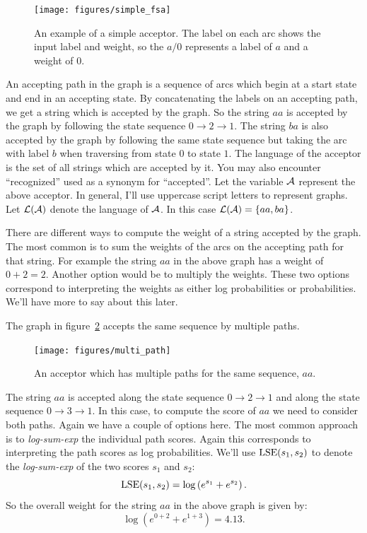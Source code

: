 \documentclass[main.tex]{subfiles}
\begin{document}
\begin{figure}
    \centering
    \texttt{[image: figures/simple\_fsa]}
    \caption{An example of a simple acceptor. The label on each arc shows the
    input label and weight, so the $a/0$ represents a label of $a$ and a weight
    of $0$.}
    \label{fig:simple_fsa}
\end{figure}

An accepting path in the graph is a sequence of arcs which begin at a start
state and end in an accepting state. By concatenating the labels on an
accepting path, we get a string which is accepted by the graph. So the string
$aa$ is accepted by the graph by following the state sequence $0 \rightarrow 2
\rightarrow 1$. The string $ba$ is also accepted by the graph by following the
same state sequence but taking the arc with label $b$ when traversing from
state $0$ to state $1$. The language of the acceptor is the set of all strings
which are accepted by it. You may also encounter ``recognized'' used as a
synonym for ``accepted''. Let the variable $\mathcal{A}$ represent the above acceptor.
In general, I'll use uppercase script letters to represent graphs. Let
$\mathcal{L}(\mathcal{A})$ denote the language of $\mathcal{A}$. In this case $\mathcal{L}(\mathcal{A})
= \{aa, ba\}$.

There are different ways to compute the weight of a string accepted by the
graph. The most common is to sum the weights of the arcs on the accepting path
for that string. For example the string $aa$ in the above graph has a weight of
$0 + 2 = 2$. Another option would be to multiply the weights. These two options
correspond to interpreting the weights as either log probabilities or
probabilities. We'll have more to say about this later.

The graph in figure~\ref{fig:multi_path} accepts the same sequence by multiple
paths.

\begin{figure}
    \centering
    \texttt{[image: figures/multi\_path]}
    \caption{An acceptor which has multiple paths for the same sequence, $aa$.}
    \label{fig:multi_path}
\end{figure}

The string $aa$ is accepted along the state sequence $0 \rightarrow 2
\rightarrow 1$ and along the state sequence $0 \rightarrow 3 \rightarrow 1$. In
this case, to compute the score of $aa$ we need to consider both paths. Again
we have a couple of options here. The most common approach is to
\emph{log-sum-exp} the individual path scores. Again this corresponds to
interpreting the path scores as log probabilities. We'll use $\operatorname*{\textrm{LSE}}(s_1, s_2)$
to denote the \emph{log-sum-exp} of the two scores $s_1$ and $s_2$:
\begin{equation}
\operatorname*{\textrm{LSE}}(s_1, s_2) = \log \left( e^{s_1} + e^{s_2}\right).
\end{equation}
So the overall weight for the string $aa$ in the above graph is given by:
$$
\log \left(e^{0 + 2} + e^{1 + 3}\right) = 4.13.
$$
\end{document}
